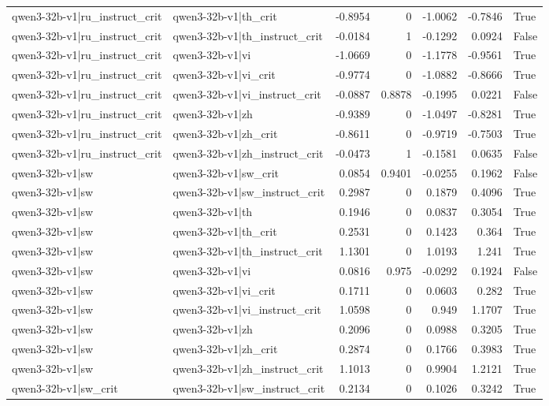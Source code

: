 \begin{table}
\begin{tabular}{l l r r r r l}
qwen3-32b-v1|ru_instruct_crit & qwen3-32b-v1|th_crit & -0.8954 & 0 & -1.0062 & -0.7846 & True \\
qwen3-32b-v1|ru_instruct_crit & qwen3-32b-v1|th_instruct_crit & -0.0184 & 1 & -0.1292 & 0.0924 & False \\
qwen3-32b-v1|ru_instruct_crit & qwen3-32b-v1|vi & -1.0669 & 0 & -1.1778 & -0.9561 & True \\
qwen3-32b-v1|ru_instruct_crit & qwen3-32b-v1|vi_crit & -0.9774 & 0 & -1.0882 & -0.8666 & True \\
qwen3-32b-v1|ru_instruct_crit & qwen3-32b-v1|vi_instruct_crit & -0.0887 & 0.8878 & -0.1995 & 0.0221 & False \\
qwen3-32b-v1|ru_instruct_crit & qwen3-32b-v1|zh & -0.9389 & 0 & -1.0497 & -0.8281 & True \\
qwen3-32b-v1|ru_instruct_crit & qwen3-32b-v1|zh_crit & -0.8611 & 0 & -0.9719 & -0.7503 & True \\
qwen3-32b-v1|ru_instruct_crit & qwen3-32b-v1|zh_instruct_crit & -0.0473 & 1 & -0.1581 & 0.0635 & False \\
qwen3-32b-v1|sw & qwen3-32b-v1|sw_crit & 0.0854 & 0.9401 & -0.0255 & 0.1962 & False \\
qwen3-32b-v1|sw & qwen3-32b-v1|sw_instruct_crit & 0.2987 & 0 & 0.1879 & 0.4096 & True \\
qwen3-32b-v1|sw & qwen3-32b-v1|th & 0.1946 & 0 & 0.0837 & 0.3054 & True \\
qwen3-32b-v1|sw & qwen3-32b-v1|th_crit & 0.2531 & 0 & 0.1423 & 0.364 & True \\
qwen3-32b-v1|sw & qwen3-32b-v1|th_instruct_crit & 1.1301 & 0 & 1.0193 & 1.241 & True \\
qwen3-32b-v1|sw & qwen3-32b-v1|vi & 0.0816 & 0.975 & -0.0292 & 0.1924 & False \\
qwen3-32b-v1|sw & qwen3-32b-v1|vi_crit & 0.1711 & 0 & 0.0603 & 0.282 & True \\
qwen3-32b-v1|sw & qwen3-32b-v1|vi_instruct_crit & 1.0598 & 0 & 0.949 & 1.1707 & True \\
qwen3-32b-v1|sw & qwen3-32b-v1|zh & 0.2096 & 0 & 0.0988 & 0.3205 & True \\
qwen3-32b-v1|sw & qwen3-32b-v1|zh_crit & 0.2874 & 0 & 0.1766 & 0.3983 & True \\
qwen3-32b-v1|sw & qwen3-32b-v1|zh_instruct_crit & 1.1013 & 0 & 0.9904 & 1.2121 & True \\
qwen3-32b-v1|sw_crit & qwen3-32b-v1|sw_instruct_crit & 0.2134 & 0 & 0.1026 & 0.3242 & True \\

\end{tabular}
\end{table}
